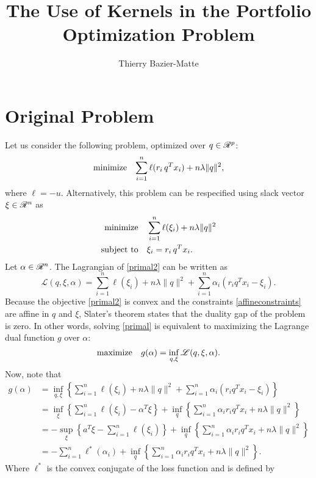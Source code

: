 \documentclass{article}
\title{The Use of Kernels in the Portfolio Optimization Problem}
\author{Thierry Bazier-Matte}
\newcommand{\lag}{\mathscr{L}}
\newcommand{\sumi}{\sum_{i=1}^n}
\begin{document}
\maketitle


\section{Original Problem}


Let us consider the following problem, optimized over $q\in\mathscr{R}^p$:
\begin{equation}
  \label{primal}
  \minimizeEquation{\sumi \ell(r_i\,q^Tx_i) + n\lambda\|q\|^2},
\end{equation}
where $\ell=-u$. Alternatively, this problem can be respecified using slack vector
$\xi\in\mathscr{R}^n$ as
\begin{align}
  \minimizeEquationSt{\label{primal2}\sumi \ell(\xi_i) + n\lambda\|q\|^2}[\label{affineconstraints}\xi_i = r_i\,q^Tx_i.] 
\end{align}
Let $\alpha\in\mathscr{R}^n$. The Lagrangian of \eqref{primal2} can be written as
\begin{equation}
  \lag(q,\xi,\alpha) = \sumi \ell(\xi_i) + n\lambda\|q\|^2 + \sumi \alpha_i(r_iq^Tx_i - \xi_i).
\end{equation}
Because the objective \eqref{primal2} is convex and the constraints
\eqref{affineconstraints} are affine in $q$ and $\xi$, Slater's theorem states that the
duality gap of the problem is zero. In other words, solving \eqref{primal} is equivalent
to maximizing the Lagrange dual function $g$ over $\alpha$:
\begin{equation}
  \maximizeEquation{g(\alpha) = \inf_{q,\xi} \lag(q,\xi,\alpha).}
\end{equation}
Now, note that
\begin{align}
  g(\alpha)
  &= \inf_{q,\xi} \left\{\sumi \ell(\xi_i) + n\lambda\|q\|^2 + \sumi \alpha_i(r_iq^Tx_i -
    \xi_i)\right\}\\
  &= \inf_\xi\left\{\sumi \ell(\xi_i) - \alpha^T\xi\right\} + \inf_q\left\{\sumi \alpha_ir_iq^Tx_i +
    n\lambda\|q\|^2\right\}\\
  & = -\sup_\xi\left\{a^T\xi - \sumi \ell(\xi_i)\right\} + \inf_q\left\{\sumi \alpha_ir_iq^Tx_i +
    n\lambda\|q\|^2\right\}\\
  & = -\sumi \ell^*(\alpha_i) + \inf_q\left\{\sumi \alpha_ir_iq^Tx_i +n\lambda\|q\|^2\right\}.\label{deriv1} 
\end{align}
Where $\ell^*$ is the convex conjugate of the loss function and is defined by
\end{document}
